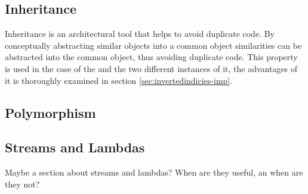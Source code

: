 \subsection{Inheritance} 
Inheritance is an architectural tool that helps to avoid duplicate code. By conceptually abstracting similar objects into a common object similarities can be abstracted into the common object, thus avoiding duplicate code. This property is used in the case of the  and the two different instances of it, the advantages of it is thoroughly examined in section \ref{sec:invertedindicies-imp}.

\subsection{Polymorphism} 

\subsection{Streams and Lambdas}
Maybe a section about streams and lambdas? When are they useful, an when are they not?


 
